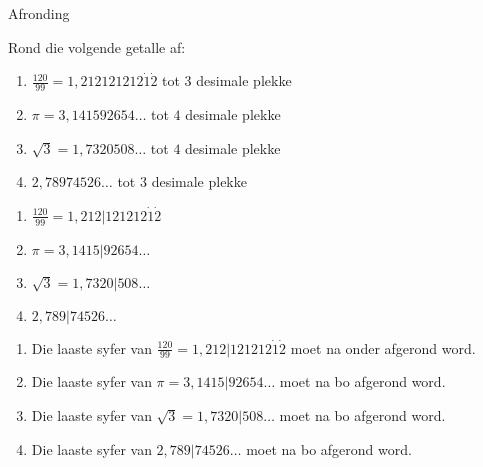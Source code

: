 \vspace*{-30pt}
\begin{wex}{Afronding}

{
\begin{minipage}{\textwidth}
Rond die volgende getalle af: 

\begin{enumerate}[itemsep=2pt, label=\textbf{\arabic*}. ] 

\item $\frac{120}{99}=1,212121212\dot{1}\dot{2}$ tot $3$ desimale plekke
\item $\pi =3,141592654\ldots$ tot $4$ desimale plekke
\item $\sqrt{3}=1,7320508\ldots$ tot $4$ desimale plekke
\item $2,78974526\ldots$ tot $3$ desimale plekke
\end{enumerate}
\end{minipage}\vspace*{-20pt}
}
{


\begin{minipage}{\textwidth}
\vspace*{7pt}
\begin{enumerate}[itemsep=2pt, label=\textbf{\arabic*}. ] 
\item $\frac{120}{99}=1,212|121212\dot{1}\dot{2}$
\item $\pi =3,1415|92654\ldots$
\item $\sqrt{3}=1,7320|508\ldots$
\item $2,789|74526\ldots$
\end{enumerate}
\end{minipage}
\begin{minipage}{0.8\textwidth}
\vspace*{7pt}
\begin{enumerate}[itemsep=2pt, label=\textbf{\arabic*}. ]
\item Die laaste syfer van $\frac{120}{99}=1,212|121212\dot{1}\dot{2}$  moet na onder afgerond word.
\item Die laaste syfer van $\pi =3,1415|92654\ldots$ moet na bo afgerond word.
\item Die laaste syfer van $\sqrt{3}=1,7320|508\ldots$ moet na bo afgerond word.
\item Die laaste syfer van $2,789|74526\ldots$ moet na bo afgerond word.  


\end{enumerate}
\end{minipage}}
\end{wex}
